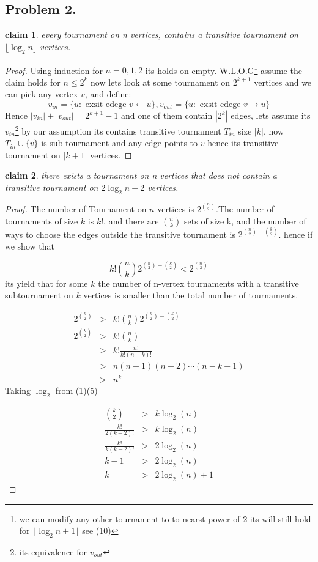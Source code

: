 \documentclass[12pt]{article}
\newtheorem*{claim*}{claim}
\begin{document}
\subsection*{Problem 2.}
\begin{claim*}
every tournament on n vertices, contains a transitive tournament on
$\lfloor \log_2 n \rfloor$ vertices.
\end{claim*}
\begin{proof}Using induction for $n=0,1,2$ its holds on empty.
 W.L.O.G\footnote{we can modify any other tournament to to nearst power of 2 its will still hold for $\lfloor \log_2 n+1 \rfloor$ see (10)  } assume the claim holds for $n\leq 2^k$ now lets look at some tournament on $2^{k+1}$ vertices and we can pick any vertex $v$, and define:
 \[v_{in}=\{u : \text{ exsit edege } v\leftarrow u\}
 ,v_{out}=\{u : \text{ exsit edege } v\rightarrow u\}
 \]
Hence  $|v_{in}|+|v_{out}|=2^{k+1}-1$ and one of them contain $|2^k|$ edges, lets assume its  $v_{in}$\footnote{ its  equivalence for $v_{out}$} by our assumption its contains transitive tournament $T_{in}$  size $|k|$. 
now $T_{in}\cup \{v\}$ is sub tournament and any edge points to $v$ hence its transitive tournament on $|k+1|$ vertices.\end{proof}
\begin{claim*}
there exists a tournament on n vertices that does not contain a
transitive tournament on $2 \log_2 n + 2 $ vertices.
\end{claim*}
\begin{proof}
The number of Tournament on $n$ vertices is $2^{\binom{n}{2}}$.The number of tournaments of size $k$ is $k!$, and there are $\binom{n}{k}$ sets of size k, and the number of ways to choose the edges outside the transitive tournament is ${2^{\binom n2 - \binom k2}}$. hence if we show that 

\[k! \binom nk 2^{\binom n2 - \binom k2} < 2^{\binom n2}
\]
its yield that for some $k$   the number of n-vertex tournaments with a transitive subtournament on $k$ vertices is smaller than the total number of tournaments.
\item \begin{eqnarray}
2^{\binom n2} &>& k! \binom nk 2^{\binom n2 - \binom k2} \\
2^{\binom k2}&>& k! \binom nk  \\
&>& k!\frac{n!}{k!(n-k)!} \\
&>& n(n-1)(n-2) \dotsm (n-k+1)\\
&>& n^k 
\end{eqnarray}
Taking $\log_2$ from (1)(5)
\item \begin{eqnarray}
{\binom k2} &>& k\log_2(n)  \\
\frac{k!}{2(k-2)!}&>& k\log_2(n) \\
\frac{k!}{k(k-2)!}&>& 2\log_2(n)\\
k-1&>& 2\log_2(n)\\
k&>& 2\log_2(n)+1
\end{eqnarray}
\end{proof}
\end{document}
